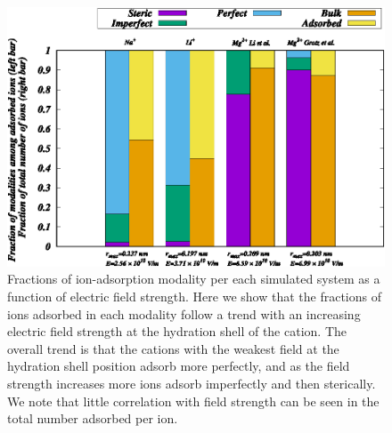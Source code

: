 \documentclass[journal=langd5,manuscript=article]{achemso}
\begin{document}
\begin{figure}
    \caption{Fractions of ion-adsorption modality per each simulated system as a function of electric field strength. Here we 
    show that the fractions of ions adsorbed in each modality follow a trend with an increasing electric field strength at the
    hydration shell of the cation. The overall trend is that the cations with the weakest field at the hydration shell position
    adsorb more perfectly, and as the field strength increases more ions adsorb imperfectly and then sterically. We note
    that little correlation with field strength can be seen in the total number adsorbed per ion.}
    \label{fig:cationfrac}
    \includegraphics{Figure_8.eps}
\end{figure}
\clearpage
\end{document}
